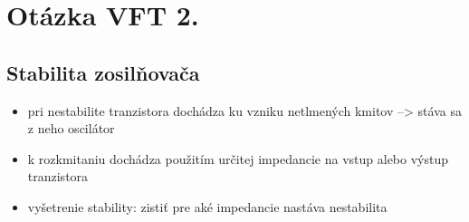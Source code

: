{{%
								
%	
	\newpage
	\chapter{Otázka VFT 2.}
	\section{Stabilita zosilňovača}

	\begin{itemize}[label=--]
	\item pri nestabilite tranzistora dochádza ku vzniku netlmených kmitov --> stáva sa z neho oscilátor
	\item k rozkmitaniu dochádza použitím určitej impedancie na vstup alebo výstup tranzistora
	\item vyšetrenie stability: zistiť pre aké impedancie nastáva nestabilita 
	\end{itemize}
	
}}
